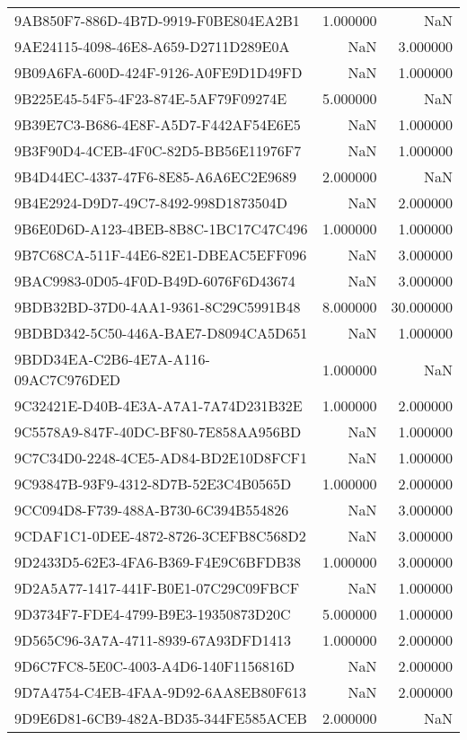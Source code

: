 \begin{tabular}{lrr}
9AB850F7-886D-4B7D-9919-F0BE804EA2B1 & 1.000000 & NaN \\
9AE24115-4098-46E8-A659-D2711D289E0A & NaN & 3.000000 \\
9B09A6FA-600D-424F-9126-A0FE9D1D49FD & NaN & 1.000000 \\
9B225E45-54F5-4F23-874E-5AF79F09274E & 5.000000 & NaN \\
9B39E7C3-B686-4E8F-A5D7-F442AF54E6E5 & NaN & 1.000000 \\
9B3F90D4-4CEB-4F0C-82D5-BB56E11976F7 & NaN & 1.000000 \\
9B4D44EC-4337-47F6-8E85-A6A6EC2E9689 & 2.000000 & NaN \\
9B4E2924-D9D7-49C7-8492-998D1873504D & NaN & 2.000000 \\
9B6E0D6D-A123-4BEB-8B8C-1BC17C47C496 & 1.000000 & 1.000000 \\
9B7C68CA-511F-44E6-82E1-DBEAC5EFF096 & NaN & 3.000000 \\
9BAC9983-0D05-4F0D-B49D-6076F6D43674 & NaN & 3.000000 \\
9BDB32BD-37D0-4AA1-9361-8C29C5991B48 & 8.000000 & 30.000000 \\
9BDBD342-5C50-446A-BAE7-D8094CA5D651 & NaN & 1.000000 \\
9BDD34EA-C2B6-4E7A-A116-09AC7C976DED & 1.000000 & NaN \\
9C32421E-D40B-4E3A-A7A1-7A74D231B32E & 1.000000 & 2.000000 \\
9C5578A9-847F-40DC-BF80-7E858AA956BD & NaN & 1.000000 \\
9C7C34D0-2248-4CE5-AD84-BD2E10D8FCF1 & NaN & 1.000000 \\
9C93847B-93F9-4312-8D7B-52E3C4B0565D & 1.000000 & 2.000000 \\
9CC094D8-F739-488A-B730-6C394B554826 & NaN & 3.000000 \\
9CDAF1C1-0DEE-4872-8726-3CEFB8C568D2 & NaN & 3.000000 \\
9D2433D5-62E3-4FA6-B369-F4E9C6BFDB38 & 1.000000 & 3.000000 \\
9D2A5A77-1417-441F-B0E1-07C29C09FBCF & NaN & 1.000000 \\
9D3734F7-FDE4-4799-B9E3-19350873D20C & 5.000000 & 1.000000 \\
9D565C96-3A7A-4711-8939-67A93DFD1413 & 1.000000 & 2.000000 \\
9D6C7FC8-5E0C-4003-A4D6-140F1156816D & NaN & 2.000000 \\
9D7A4754-C4EB-4FAA-9D92-6AA8EB80F613 & NaN & 2.000000 \\
9D9E6D81-6CB9-482A-BD35-344FE585ACEB & 2.000000 & NaN \\

\end{tabular}
